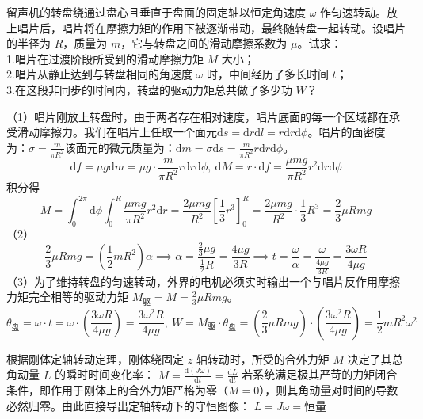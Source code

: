 \begin{exercise}
留声机的转盘绕通过盘心且垂直于盘面的固定轴以恒定角速度 $\omega$ 作匀速转动。放上唱片后，唱片将在摩擦力矩的作用下被逐渐带动，最终随转盘一起转动。设唱片的半径为 $R$，质量为 $m$，它与转盘之间的滑动摩擦系数为 $\mu$。试求：\\
1.唱片在过渡阶段所受到的滑动摩擦力矩 $M$ 大小；\\
2.唱片从静止达到与转盘相同的角速度 $\omega$ 时，中间经历了多长时间 $t$；\\
3.在这段非同步的时间内，转盘的驱动力矩总共做了多少功 $W$？
\end{exercise}
\begin{solution}
（1）唱片刚放上转盘时，由于两者存在相对速度，唱片底面的每一个区域都在承受滑动摩擦力。我们在唱片上任取一个面元$\mathrm{d}s = \mathrm{d}r\mathrm{d}l= r\mathrm{d}r\mathrm{d}\phi$。唱片的面密度为：$\sigma = \frac{m}{\pi R^2}$该面元的微元质量为：$\mathrm{d}m = \sigma \mathrm{d}s = \frac{m}{\pi R^2} r\mathrm{d}r\mathrm{d}\phi$。
$$\mathrm{d}f = \mu g\mathrm{d}m = \mu g \cdot \frac{m}{\pi R^2} r\mathrm{d}r\mathrm{d}\phi,~\mathrm{d}M = r \cdot \mathrm{d}f = \frac{\mu m g}{\pi R^2} r^2 \mathrm{d}r\mathrm{d}\phi$$积分得
\[M =\int_0^{2\pi}\mathrm{d}\phi\int_0^R \frac{\mu m g}{\pi R^2} r^2\mathrm{d}r=\frac{2\mu m g}{R^2} \left[ \frac{1}{3}r^3 \right]_0^R = \frac{2\mu m g}{R^2} \cdot \frac{1}{3}R^3 = \frac{2}{3}\mu R m g\]
（2）$$\frac{2}{3}\mu R m g = \left( \frac{1}{2}mR^2 \right) \alpha\implies \alpha = \frac{\frac{2}{3}\mu g}{\frac{1}{2}R} = \frac{4\mu g}{3R}\implies t = \frac{\omega}{\alpha} = \frac{\omega}{\frac{4\mu g}{3R}} = \frac{3\omega R}{4\mu g}$$
（3）为了维持转盘的匀速转动，外界的电机必须实时输出一个与唱片反作用摩擦力矩完全相等的驱动力矩 $M_{\text{驱}} = M = \frac{2}{3}\mu R m g$。
$$\theta_{\text{盘}} = \omega \cdot t = \omega \cdot \left( \frac{3\omega R}{4\mu g} \right) = \frac{3\omega^2 R}{4\mu g},~W = M_{\text{驱}} \cdot \theta_{\text{盘}} = \left( \frac{2}{3}\mu R m g \right) \cdot \left( \frac{3\omega^2 R}{4\mu g} \right)=\frac{1}{2}mR^2\omega^2$$
\end{solution}

\begin{theorem}[刚体定轴转动的角动量守恒定律]
根据刚体定轴转动定理，刚体绕固定 $z$ 轴转动时，所受的合外力矩 $M$ 决定了其总角动量 $L$ 的瞬时时间变化率： \(M = \frac{\mathrm{d}(J\omega)}{\mathrm{d}t} = \frac{\mathrm{d}L}{\mathrm{d}t}\) 若系统满足极其严苛的力矩闭合条件，即作用于刚体上的合外力矩严格为零（$M = 0$），则其角动量对时间的导数必然归零。由此直接导出定轴转动下的守恒图像： \(L = J\omega = \text{恒量}\) 
\end{theorem}

